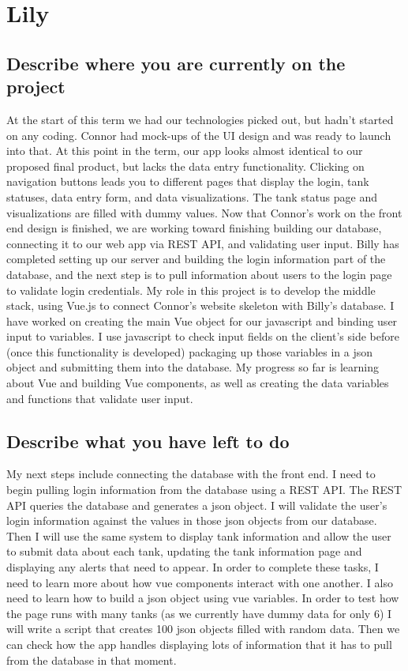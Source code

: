 \documentclass[draftclsnofoot,onecolumn,letterpaper,10pt,compsoc]{IEEEtran}
\begin{document}
\section{Lily}
\subsection{Describe where you are currently on the project}
At the start of this term we had our technologies picked out, but hadn’t started on any coding. Connor had mock-ups of the UI design and was ready to launch into that. At this point in the term, our app looks almost identical to our proposed final product, but lacks the data entry functionality. Clicking on navigation buttons leads you to different pages that display the login, tank statuses, data entry form, and data visualizations. The tank status page and visualizations are filled with dummy values. Now that Connor’s work on the front end design is finished, we are working toward finishing building our database, connecting it to our web app via REST API, and validating user input. Billy has completed setting up our server and building the login information part of the database, and the next step is to pull information about users to the login page to validate login credentials. My role in this project is to develop the middle stack, using Vue.js to connect Connor’s website skeleton with Billy’s database. I have worked on creating the main Vue object for our javascript and binding user input to variables. I use javascript to check input fields on the client’s side before (once this functionality is developed) packaging up those variables in a json object and submitting them into the database. My progress so far is learning about Vue and building Vue components, as well as creating the data variables and functions that validate user input.

\subsection{Describe what you have left to do}
My next steps include connecting the database with the front end. I need to begin pulling login information from the database using a REST API. The REST API queries the database and generates a json object. I will validate the user’s login information against the values in those json objects from our database. Then I will use the same system to display tank information and allow the user to submit data about each tank, updating the tank information page and displaying any alerts that need to appear. In order to complete these tasks, I need to learn more about how vue components interact with one another. I also need to learn how to build a json object using vue variables. In order to test how the page runs with many tanks (as we currently have dummy data for only 6) I will write a script that creates 100 json objects filled with random data. Then we can check how the app handles displaying lots of information that it has to pull from the database in that moment.
\end{document}
